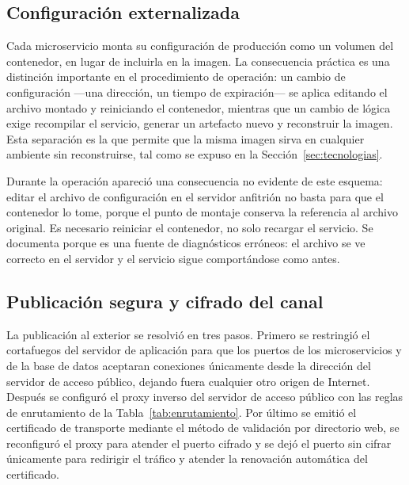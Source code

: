 \normalsize
\setlength{\tabcolsep}{6pt}
\renewcommand{\arraystretch}{1}

\subsection{Configuración externalizada}
Cada microservicio monta su configuración de producción como un volumen del contenedor, en lugar
de incluirla en la imagen. La consecuencia práctica es una distinción importante en el
procedimiento de operación: un cambio de configuración ---una dirección, un tiempo de
expiración--- se aplica editando el archivo montado y reiniciando el contenedor, mientras que un
cambio de lógica exige recompilar el servicio, generar un artefacto nuevo y reconstruir la
imagen. Esta separación es la que permite que la misma imagen sirva en cualquier ambiente sin
reconstruirse, tal como se expuso en la Sección~\ref{sec:tecnologias}.

Durante la operación apareció una consecuencia no evidente de este esquema: editar el archivo de
configuración en el servidor anfitrión no basta para que el contenedor lo tome, porque el punto de
montaje conserva la referencia al archivo original. Es necesario reiniciar el contenedor, no solo
recargar el servicio. Se documenta porque es una fuente de diagnósticos erróneos: el archivo se ve
correcto en el servidor y el servicio sigue comportándose como antes.

\subsection{Publicación segura y cifrado del canal}
La publicación al exterior se resolvió en tres pasos. Primero se restringió el cortafuegos del
servidor de aplicación para que los puertos de los microservicios y de la base de datos aceptaran
conexiones únicamente desde la dirección del servidor de acceso público, dejando fuera cualquier
otro origen de Internet. Después se configuró el proxy inverso del servidor de acceso público con
las reglas de enrutamiento de la Tabla~\ref{tab:enrutamiento}. Por último se emitió el certificado
de transporte mediante el método de validación por directorio web, se reconfiguró el proxy para
atender el puerto cifrado y se dejó el puerto sin cifrar únicamente para redirigir el tráfico y
atender la renovación automática del certificado.

